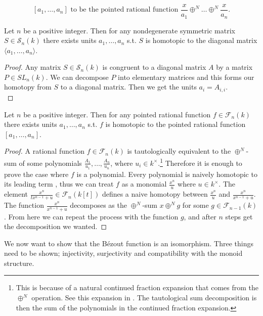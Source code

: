 \begin{equation*}\label{def:pointed rational function [a...a]}
[a_1,\dots,a_n] \text{ to be the pointed rational function } \frac{x}{a_1}\oplus^N \dots \oplus^N \frac{x}{a_n}.
\end{equation*}
%
\begin{lemma}\label{Lm:homotopy-lemma in S}
%
Let \(n\) be a positive integer. Then for any nondegenerate symmetric matrix \(S \in \mathcal{S}_n(k)\) there exists units \(a_1, \dots ,a_n\) s.t. \(S\) is homotopic to the diagonal matrix \(\langle a_1, \dots, a_n\rangle \).
%
\begin{proof} 
Any matrix \(S \in \mathcal{S}_n(k)\) is congruent to a diagonal matrix \(A\) by a matrix \(P\in SL_n(k)\). We can decompose \(P\) into elementary matrices and this forms our homotopy from \(S\) to a diagonal matrix. Then we get the units \(a_i = A_{i,i}\). \\
%
\end{proof}
%
\end{lemma}
%
\begin{lemma}\label{Lm:homotopy-lemma in F}
Let \(n\) be a positive integer. Then for any pointed rational function \(f\in \mathcal{F}_n(k)\) there exists units \(a_1, \dots, a_n\) s.t. \(f\) is homotopic to the pointed rational function \([a_1, \dots,a_n]\).
%
\begin{proof}
A rational function \(f \in \mathcal{F}_n(k)\) is tautologically equivalent to the \(\oplus^N\)-sum of some polynomials \(\frac{A_1}{u_1}, \dots , \frac{A_n}{u_n}\), where \(u_i \in k^{\times}\).\footnote{This is because of a natural continued fraction expansion that comes from the \(\oplus^N\) operation. See this expansion in \cite[Ex 3.3]{Cazanave}. The tautological sum decomposition is then the sum of the polynomials in the continued fraction expansion.} Therefore it is enough to prove the case where \(f\) is a polynomial. Every polynomial is naively homotopic to its leading term \cite[Ex 2.4]{Cazanave}, thus we can treat \(f\) as a monomial \(\frac{x^n}{u}\) where \(u\in k^{\times}\). The element \(\frac{x^n}{tx^{n-1}+u} \in \mathcal{F}_n(k[t])\) defines a naive homotopy between \(\frac{x^n}{u}\) and \(\frac{x^n}{x^{n-1}+u}\). The function \(\frac{x^n}{x^{n-1}+u}\) decomposes as the \(\oplus^N\)-sum \(x\oplus^N g\) for some \(g\in \mathcal{F}_{n-1}(k)\). From here we can repeat the process with the function \(g\), and after \(n\) steps get the decomposition we wanted.
%
\end{proof}
%
\end{lemma}
%
We now want to show that the Bézout function is an isomorphism. Three things need to be shown; injectivity, surjectivity and compatibility with the monoid structure.  
%

